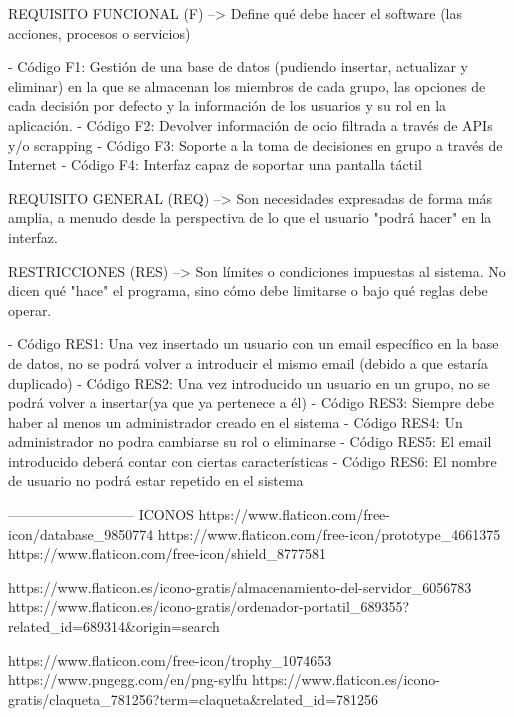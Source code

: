 REQUISITO FUNCIONAL (F) --> Define qué debe hacer el software (las acciones, procesos o servicios)

 - Código F1: Gestión de una base de datos (pudiendo insertar, actualizar y eliminar) en la que se almacenan los miembros de cada grupo, las opciones de cada decisión por defecto y la información de los usuarios y su rol en la aplicación.
 - Código F2: Devolver información de ocio filtrada a través de APIs y/o scrapping 
 - Código F3: Soporte a la toma de decisiones en grupo a través de Internet
 - Código F4: Interfaz capaz de soportar una pantalla táctil



REQUISITO GENERAL (REQ) --> Son necesidades expresadas de forma más amplia, a menudo desde la perspectiva de lo que el usuario "podrá hacer" en la interfaz.




 RESTRICCIONES (RES) --> Son límites o condiciones impuestas al sistema. No dicen qué "hace" el programa, sino cómo debe limitarse o bajo qué reglas debe operar.
 
 - Código RES1: Una vez insertado un usuario con un email específico en la base de datos, no se podrá volver a introducir el mismo  email (debido a que estaría duplicado)
- Código RES2: Una vez introducido un usuario en un grupo, no se podrá volver a insertar(ya que ya pertenece a él)
- Código RES3: Siempre debe haber al menos un administrador creado en el sistema
- Código RES4: Un administrador no podra cambiarse su rol o eliminarse
- Código RES5: El email introducido deberá contar con ciertas características
- Código RES6: El nombre de usuario no podrá estar repetido en el sistema








---------------------------
ICONOS
https://www.flaticon.com/free-icon/database_9850774
https://www.flaticon.com/free-icon/prototype_4661375
https://www.flaticon.com/free-icon/shield_8777581

https://www.flaticon.es/icono-gratis/almacenamiento-del-servidor_6056783
https://www.flaticon.es/icono-gratis/ordenador-portatil_689355?related_id=689314&origin=search

https://www.flaticon.com/free-icon/trophy_1074653
https://www.pngegg.com/en/png-sylfu
https://www.flaticon.es/icono-gratis/claqueta_781256?term=claqueta&related_id=781256


